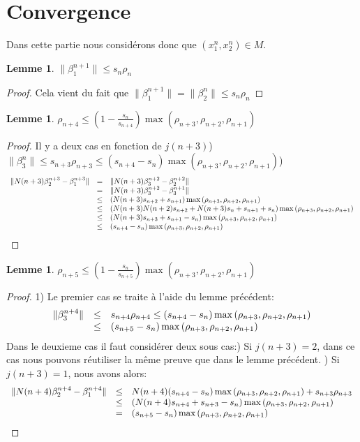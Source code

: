 \documentclass[12pt]{article}
\theoremstyle{plain}%
\newtheorem{lem}[thm]{Lemme}
\theoremstyle{definition}
\theoremstyle{remark}
\begin{document}
\section{Convergence}
Dans cette partie nous considérons donc que $(x_1^n,x_2^n)\in M$.
\begin{lem}
$\|\beta_1^{n+1}\| \leq s_n \rho_n$
\end{lem}
\begin{proof}
Cela vient du fait que $\|\beta_1^{n+1}\|=\| \beta_2^n\| \leq s_n \rho_n$
\end{proof}
\begin{lem}
$\rho_{n+4} \leq (1-\frac{s_n}{s_{n+4}})\max{(\rho_{n+3},\rho_{n+2},\rho_{n+1})}$
\end{lem}
\begin{proof}
Il y a deux cas en fonction de $j(n+3)$) $\| \beta_3^{n} \| \leq s_{n+3} \rho_{n+3} \leq (s_{n+4}-s_n) \max{(\rho_{n+3},\rho_{n+2},\rho_{n+1})} $)\[\begin{array}{c c l}
\|N(n+3) \beta_2^{n+3} - \beta_1^{n+3} \| & = &\|N(n+3) \beta_3^{n+2} - \beta_2^{n+2} \|\\
 & = & \|N(n+3) \beta_3^{n+2} - \beta_3^{n+1} \| \\
 & \leq & (N(n+3)s_{n+2}+s_{n+1})\max{(\rho_{n+3},\rho_{n+2},\rho_{n+1})} \\
 & \leq & (N(n+3)N(n+2)s_{n+2}+N(n+3)s_n+s_{n+1}+s_n)\max{(\rho_{n+3},\rho_{n+2},\rho_{n+1})} \\
 & \leq &  (N(n+3)s_{n+3}+s_{n+1}-s_n)\max{(\rho_{n+3},\rho_{n+2},\rho_{n+1})} \\
 & \leq & (s_{n+4}-s_n)\max{(\rho_{n+3},\rho_{n+2},\rho_{n+1})}
\end{array}
\]
\end{proof}
\begin{lem}
$\rho_{n+5} \leq (1-\frac{s_n}{s_{n+5}})\max{(\rho_{n+3},\rho_{n+2},\rho_{n+1})}$
\end{lem}
\begin{proof}
1) Le premier cas se traite à l'aide du lemme précédent:\[
\begin{array}{c c l}
\| \beta_3^{n+4} \|& \leq & s_{n+4} \rho_{n+4} \leq (s_{n+4}-s_n)\max{(\rho_{n+3},\rho_{n+2},\rho_{n+1})}\\
 & \leq & (s_{n+5}-s_n)\max{(\rho_{n+3},\rho_{n+2},\rho_{n+1})}
\end{array}
\]
Dans le deuxieme cas il faut considérer deux sous cas:) Si $j(n+3)=2$, dans ce cas nous pouvons réutiliser la même preuve que dans le lemme précédent. ) Si $j(n+3)=1$, nous avons alors:\newline
\[\begin{array}{c c l}
\|N(n+4) \beta_2^{n+4}-\beta_1^{n+4}\|& \leq & N(n+4)(s_{n+4}-s_n)\max{(\rho_{n+3},\rho_{n+2},\rho_{n+1})} + s_{n+3} \rho_{n+3}\\
 & \leq & (N(n+4)s_{n+4}+s_{n+3}-s_n)\max{(\rho_{n+3},\rho_{n+2},\rho_{n+1})} \\
 & =& (s_{n+5}-s_n)\max{(\rho_{n+3},\rho_{n+2},\rho_{n+1})}
\end{array}
\]
\end{proof}
\end{document}
